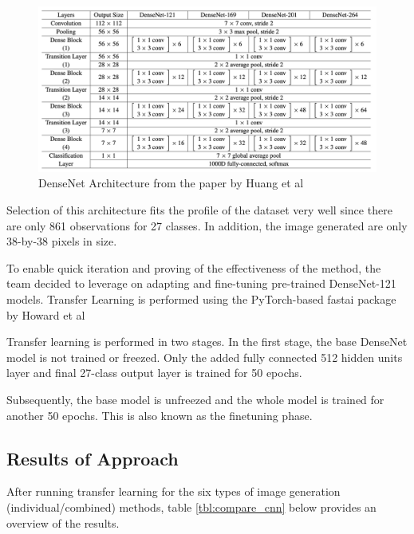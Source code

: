 \documentclass[conference]{IEEEtran}
\begin{document}
\begin{figure}[H]
\begin{center}
\includegraphics[scale=0.27]{Image/densenet2.png}
\caption{\label{densenet} DenseNet Architecture from the paper by Huang et al}
\end{center}
\end{figure}

Selection of this architecture fits the profile of the dataset very well since there are only 861 observations for 27 classes. In addition, the image generated are only 38-by-38 pixels in size.

To enable quick iteration and proving of the effectiveness of the method, the team decided to leverage on adapting and fine-tuning pre-trained DenseNet-121 models. Transfer Learning is performed using the PyTorch-based fastai package by Howard et al \cite{howard2018fastai}

Transfer learning is performed in two stages. In the first stage, the base DenseNet model is not trained or freezed. Only the added fully connected 512 hidden units layer and final 27-class output layer is trained for 50 epochs.

Subsequently, the base model is unfreezed and the whole model is trained for another 50 epochs. This is also known as the finetuning phase.

\subsection{Results of Approach}
After running transfer learning for the six types of image generation (individual/combined) methods, table \ref{tbl:compare_cnn} below provides an overview of the results.
\end{document}
